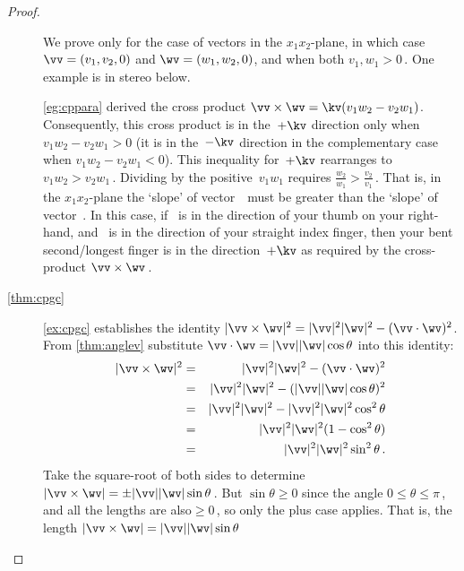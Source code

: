 \begin{proof}
\begin{description}
We prove only for the case of vectors in the \(x_1x_2\)-plane, in which case \(\vv=(v_1,v_2,0)\) and \(\wv=(w_1,w_2,0)\), and when both \(v_1,w_1>0\)\,.
One example is in stereo below.
\begin{center}
\end{center}
\cref{eg:cppara} derived the cross product \(\vv\times\wv=\kv(v_1w_2-v_2w_1)\).
Consequently, this cross product is in the~\(+\kv\) direction only when \(v_1w_2-v_2w_1>0\) (it is in the~\(-\kv\) direction in the complementary case when \(v_1w_2-v_2w_1<0\)). 
This inequality for~\(+\kv\) rearranges to \(v_1w_2>v_2w_1\)\,.
Dividing by the positive~\(v_1w_1\) requires \(\frac{w_2}{w_1}>\frac{v_2}{v_1}\)\,.
That is, in the \(x_1x_2\)-plane the `slope' of vector~\wv\ must be greater than the `slope' of vector~\vv.
In this case, if \vv~is in the direction of your thumb on your right-hand, and \wv~is in the direction of your straight index finger, then your bent second\slash longest finger is in the direction~\(+\kv\) as required by the cross-product \(\vv\times\wv\)\,.

\item[\ref{thm:cpgc}] \cref{ex:cpgc} establishes the identity \(|\vv\times\wv|^2=|\vv|^2|\wv|^2-(\vv\cdot\wv)^2\).
From \cref{thm:anglev} substitute \(\vv\cdot\wv=|\vv||\wv|\cos\theta\) into this identity:
\begin{eqnarray*}
|\vv\times\wv|^2&=&|\vv|^2|\wv|^2-(\vv\cdot\wv)^2
\\&=&|\vv|^2|\wv|^2-(|\vv||\wv|\cos\theta)^2
\\&=&|\vv|^2|\wv|^2-|\vv|^2|\wv|^2\cos^2\theta
\\&=&|\vv|^2|\wv|^2(1-\cos^2\theta)
\\&=&|\vv|^2|\wv|^2\sin^2\theta\,.
\end{eqnarray*}
Take the square-root of both sides to determine \(|\vv\times\wv|=\pm|\vv||\wv|\sin\theta\)\,.
But \(\sin\theta\geq0\) since the angle \(0\leq\theta\leq\pi\)\,, and all the lengths are also\({}\geq0\)\,, so only the plus case applies.
That is, the length \(|\vv\times\wv|=|\vv||\wv|\sin\theta\) 


\end{description}
\end{proof}
